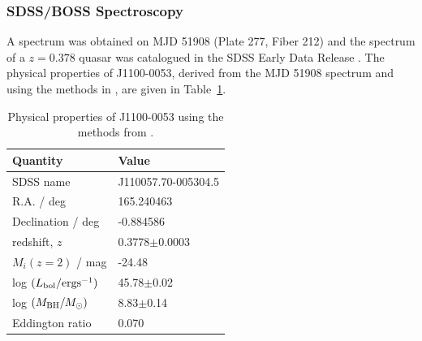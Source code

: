 \documentclass[11pt,a4paper]{article}
\begin{document}
\subsubsection{SDSS/BOSS Spectroscopy}
A spectrum was obtained on MJD 51908 (Plate 277, Fiber 212) and the
spectrum of a $z=0.378$ quasar was catalogued in the SDSS Early Data
Release \citep{Stoughton2002, Schneider2002}. The physical properties
of J1100-0053, derived from the MJD 51908 spectrum and using the
methods in \citet{Shen2011}, are given in Table~\ref{tab:Shen_props}.

\begin{table}[]
    \centering
    \begin{tabular}{l l }
      \hline \hline 
      Quantity                                         &  Value \\
      \hline 
      SDSS name                                      &    J110057.70-005304.5 \\
      R.A. / deg                                        &  165.240463 \\
      Declination / deg                            &   -0.884586 \\ 
      redshift, $z$                                    &   0.3778$\pm$0.0003  \\
      $M_{i}(z=2)$  / mag                          &   -24.48  \\
      log $(L_{\rm bol} / {\rm erg s}^{-1}) $  &  45.78$\pm$0.02 \\
      log $(M_{\rm BH} / M_{\odot})  $           &  8.83$\pm$0.14 \\
      Eddington ratio                                &        0.070 \\
      \hline \hline 
    \end{tabular}
    \caption{Physical properties of J1100-0053 using the methods from 
      \citet{Shen2011}.} 
    \label{tab:Shen_props}
\end{table}
\end{document}

